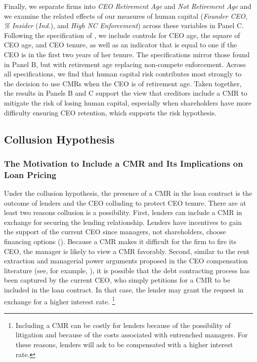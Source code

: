 \documentclass[a4paper,12pt]{article}
\begin{document}
Finally, we separate firms into \textit{CEO Retirement Age} and \textit{Not Retirement Age} and we examine the related effects of our measures of human capital (\textit{Founder CEO}, \textit{\% Insider} (\textit{Ind.}), and \textit{High NC Enforcement}) across these variables in Panel C.
Following the specification of \citet{Jenter_2015a}, we include controls for CEO age, the square of CEO age, and CEO tenure, as well as an indicator that is equal to one if the CEO is in the first two years of her tenure.
The specifications mirror those found in Panel B, but with retirement age replacing non-compete enforcement.
Across all specifications, we find that human capital risk contributes most strongly to the decision to use CMRs when the CEO is of retirement age.
Taken together, the results in Panels B and C support the view that creditors include a CMR to mitigate the risk of losing human capital, especially when shareholders have more difficulty ensuring CEO retention, which supports the risk hypothesis.






\subsection{Collusion Hypothesis}

\subsubsection{The Motivation to Include a CMR and Its Implications on Loan Pricing}

Under the collusion hypothesis, the presence of a CMR in the loan contract is the outcome of lenders and the CEO colluding to protect CEO tenure.
There are at least two reasons collusion is a possibility.
First, lenders can include a CMR in exchange for securing the lending relationship.
Lenders have incentives to gain the support of the current CEO since managers, not shareholders, choose financing options (\citet{Novaes_2003}).
Because a CMR makes it difficult for the firm to fire its CEO, the manager is likely to view a CMR favorably.
Second, similar to the rent extraction and managerial power arguments proposed in the CEO compensation literature (see, for example, \citet{Bebchuk_2003}), it is possible that the debt contracting process has been captured by the current CEO, who simply petitions for a CMR to be included in the loan contract.
In that case, the lender may grant the request in exchange for a higher interest rate.%
    \footnote{Including a CMR can be costly for lenders because of the possibility of litigation and because of the costs associated with entrenched managers. For these reasons, lenders will ask to be compensated with a higher interest rate.}
\end{document}

